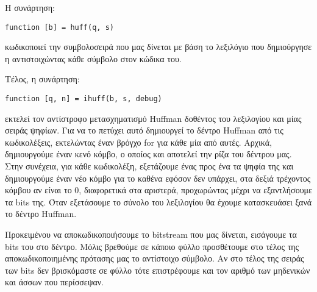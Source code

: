 \par Η συνάρτηση:
\begin{lstlisting}[style=myMatlab]
  function [b] = huff(q, s)
\end{lstlisting}
\noindent κωδικοποιεί την συμβολοσειρά που μας δίνεται με βάση το λεξιλόγιο που δημιούργησε η
 αντιστοιχώντας κάθε σύμβολο στον κώδικα του.

\par Τέλος, η συνάρτηση:
\begin{lstlisting}[style=myMatlab]
  function [q, n] = ihuff(b, s, debug)
\end{lstlisting}
\noindent εκτελεί τον αντίστροφο μετασχηματισμό Huffman δοθέντος του λεξιλογίου και μίας σειράς
ψηφίων. Για να το πετύχει αυτό δημιουργεί το δέντρο Huffman από τις κωδικολέξεις, εκτελώντας
έναν βρόγχο for για κάθε μία από αυτές. Αρχικά, δημιουργούμε έναν κενό κόμβο, ο οποίος και αποτελεί
την ρίζα του δέντρου μας. Στην συνέχεια, για κάθε κωδικολέξη, εξετάζουμε ένας προς ένα τα ψηφία της
και δημιουργούμε έναν νέο κόμβο για το καθένα εφόσον δεν υπάρχει, στα δεξιά τρέχοντος κόμβου αν
είναι το 0, διαφορετικά στα αριστερά, προχωρώντας μέχρι να εξαντλήσουμε τα bits της. Όταν εξετάσουμε
το σύνολο του λεξιλογίου θα έχουμε κατασκευάσει ξανά το δέντρο Huffman.
\par Προκειμένου να αποκωδικοποιήσουμε το bitstream που μας δίνεται, εισάγουμε τα bits του στο
δέντρο. Μόλις βρεθούμε σε κάποιο φύλλο προσθέτουμε στο τέλος της αποκωδικοποιημένης πρότασης μας το
αντίστοιχο σύμβολο. Αν στο τέλος της σειράς των bits δεν βρισκόμαστε σε φύλλο τότε επιστρέφουμε και
τον αριθμό των μηδενικών και άσσων που περίσσεψαν.
